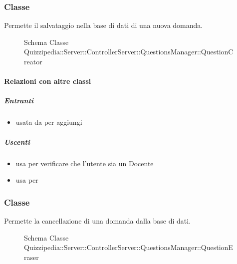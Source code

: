 \subsubsection{Classe }
Permette il salvataggio nella base di dati di una nuova domanda.
\begin{figure}[H]
\centering
\noindent{}
\caption[Schema Classe QuestionCreator]{Schema Classe Quizzipedia::Server::ControllerServer::QuestionsManager::QuestionCreator}
\end{figure}
\paragraph{Relazioni con altre classi}
\subparagraph{Entranti}
\begin{itemize}
\item usata da  per aggiungi
\end{itemize}
\subparagraph{Uscenti}
\begin{itemize}
\item usa  per verificare che l'utente sia un Docente
\item usa  per 
\end{itemize}
\subsubsection{Classe }
Permette la cancellazione di una domanda dalla base di dati.
\begin{figure}[H]
\centering
\noindent{}
\caption[Schema Classe QuestionEraser]{Schema Classe Quizzipedia::Server::ControllerServer::QuestionsManager::QuestionEraser}
\end{figure}

